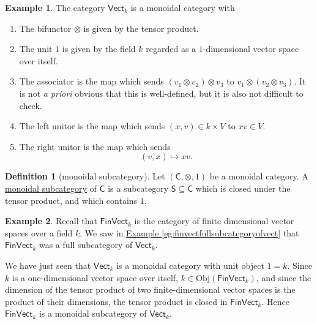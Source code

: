 \documentclass[a4paper]{report}
\newcommand{\defn}[1]{\ul{#1}}
\newcommand{\Obj}{\mathrm{Obj}}
\theoremstyle{definition}
\newtheorem{definition}{Definition}[section]
\newtheorem{example}{Example}[section]
\theoremstyle{plain}
\theoremstyle{remark}
\begin{document}
\begin{example}
  \label{eg:vectisamonoidalcategory}
  The category $\mathsf{Vect}_{k}$ is a monoidal category with
  \begin{enumerate}
    \item The bifunctor $\otimes$ is given by the tensor product.

    \item The unit $1$ is given by the field $k$ regarded as a $1$-dimensional vector space over itself.

    \item The associator is the map which sends $(v_{1} \otimes v_{2}) \otimes v_{3}$ to $v_{1} \otimes (v_{2} \otimes v_{3})$. It is not \emph{a priori} obvious that this is well-defined, but it is also not difficult to check.

    \item The left unitor is the map which sends $(x, v) \in k \times V$
      to $xv \in V$.

    \item The right unitor is the map which sends 
      \begin{equation*}
        (v, x) \mapsto xv.
      \end{equation*}
  \end{enumerate}
\end{example}

\begin{definition}[monoidal subcategory]
  \label{def:monoidalsubcategory}
  Let $(\mathsf{C}, \otimes, 1)$ be a monoidal category. A \defn{monoidal subcategory} of $\mathsf{C}$ is a subcategory $\mathsf{S} \subseteq \mathsf{C}$ which is closed under the tensor product, and which contains $1$.
\end{definition}

\begin{example}
  Recall that $\mathsf{FinVect}_{k}$ is the category of finite dimensional vector spaces over a field $k$. We saw in \hyperref[eg:finvectfullsubcategoryofvect]{Example \ref*{eg:finvectfullsubcategoryofvect}} that $\mathsf{FinVect}_{k}$ was a full subcategory of $\mathsf{Vect}_{k}$.

  We have just seen that $\mathsf{Vect}_{k}$ is a monoidal category with unit object $1 = k$. Since $k$ is a one-dimensional vector space over itself, $k \in \Obj(\mathsf{FinVect}_{k})$, and since the dimension of the tensor product of two finite-dimensional vector spaces is the product of their dimensions, the tensor product is closed in $\mathsf{FinVect}_{k}$. Hence $\mathsf{FinVect}_{k}$ is a monoidal subcategory of $\mathsf{Vect}_{k}$.
\end{example}
\end{document}
